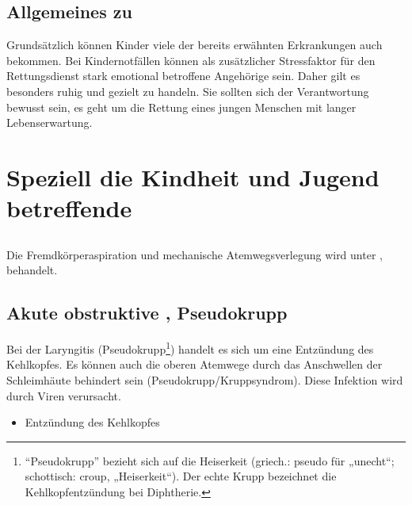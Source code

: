 
\subsection{Allgemeines zu }

\Text
{{\TxBeschreibung}}%
{%
Grundsätzlich können Kinder viele der bereits erwähnten
Erkrankungen auch bekommen. Bei Kindernotfällen können als
zusätzlicher Stressfaktor für den Rettungsdienst stark
emotional betroffene Angehörige sein. Daher gilt es
besonders ruhig und gezielt zu handeln. Sie sollten sich der
Verantwortung bewusst sein, es geht um die Rettung eines
jungen Menschen mit langer Lebenserwartung.
}%



\section{Speziell die Kindheit und Jugend betreffende }




\subsection{}


\Text
{{\TxBeschreibung}}%
{%
Die Fremdkörperaspiration und mechanische Atemwegsverlegung wird unter
,
behandelt.
}%


\subsection{Akute obstruktive , Pseudokrupp}
\label{topic:laryngitis}
\label{topic:pseudokrupp}


\TextSlide{\TxBeschreibung}
{%
Bei der Laryngitis
(Pseudokrupp\footnote{\enquote{Pseudokrupp}
bezieht sich auf die Heiserkeit (griech.: pseudo für
„unecht“; schottisch: croup,
„Heiserkeit“\cite{wiki:pseudokrupp}). Der echte Krupp
bezeichnet die Kehlkopfentzündung bei Diphtherie.}) handelt
es sich um eine Entzündung des Kehlkopfes. Es können auch die
oberen Atemwege durch das Anschwellen der Schleimhäute
behindert sein (Pseudokrupp/Kruppsyndrom). Diese Infektion
wird durch Viren verursacht. 
}{
\begin{itemize}
  \item Entzündung des Kehlkopfes
\end{itemize}
}{}{}{}



